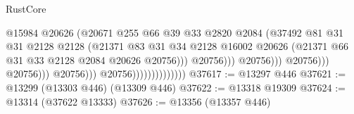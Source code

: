 \begin{lexlean}{RustCore}
\begin{coremodule}
                                                            @15984
                                                            @20626
                                                            (@20671
                                                              @255
                                                              @66
                                                              @39
                                                              @33
                                                              @2820
                                                              @2084
                                                              (@37492
                                                                @81
                                                                @31
                                                                @31
                                                                @2128
                                                                @2128
                                                                (@21371
                                                                  @83
                                                                  @31
                                                                  @34
                                                                  @2128
                                                                  @16002
                                                                  @20626
                                                                  (@21371
                                                                    @66
                                                                    @31
                                                                    @33
                                                                    @2128
                                                                    @2084
                                                                    @20626
                                                                    @20756)))
                                                              @20756)))
                                                        @20756)))
                                                  @20756)))
                                            @20756)))
                                      @20756)))
                                @20756))))))))))))))
@37617 := @13297 @446
@37621 := @13299 (@13303 @446) (@13309 @446)
@37622 := @13318 @19309
@37624 := @13314 (@37622 @13333)
@37626 := @13356 (@13357 @446)

\end{coremodule}
\end{lexlean}
